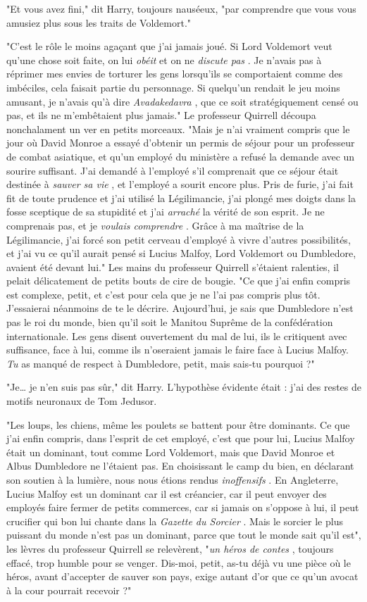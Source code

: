 "Et vous avez fini," dit Harry, toujours nauséeux, "par comprendre que vous vous amusiez plus sous les traits de Voldemort."

"C'est le rôle le moins agaçant que j'ai jamais joué. Si Lord Voldemort veut qu'une chose soit faite, on lui \emph{obéit}  et on ne \emph{discute pas} . Je n'avais pas à réprimer mes envies de torturer les gens lorsqu'ils se comportaient comme des imbéciles, cela faisait partie du personnage. Si quelqu'un rendait le jeu moins amusant, je n'avais qu'à dire \emph{Avadakedavra} , que ce soit stratégiquement censé ou pas, et ils ne m'embêtaient plus jamais." Le professeur Quirrell découpa nonchalament un ver en petits morceaux. "Mais je n'ai vraiment compris que le jour où David Monroe a essayé d'obtenir un permis de séjour pour un professeur de combat asiatique, et qu'un employé du ministère a refusé la demande avec un sourire suffisant. J'ai demandé à l'employé s'il comprenait que ce séjour était destinée à \emph{sauver sa vie} , et l'employé a sourit encore plus. Pris de furie, j'ai fait fit de toute prudence et j'ai utilisé la Légilimancie, j'ai plongé mes doigts dans la fosse sceptique de sa stupidité et j'ai \emph{arraché}  la vérité de son esprit. Je ne comprenais pas, et je \emph{voulais comprendre} . Grâce à ma maîtrise de la Légilimancie, j'ai forcé son petit cerveau d'employé à vivre d'autres possibilités, et j'ai vu ce qu'il aurait pensé si Lucius Malfoy, Lord Voldemort ou Dumbledore, avaient été devant lui." Les mains du professeur Quirrell s'étaient ralenties, il pelait délicatement de petits bouts de cire de bougie. "Ce que j'ai enfin compris est complexe, petit, et c'est pour cela que je ne l'ai pas compris plus tôt. J'essaierai néanmoins de te le décrire. Aujourd'hui, je sais que Dumbledore n'est pas le roi du monde, bien qu'il soit le Manitou Suprême de la confédération internationale. Les gens disent ouvertement du mal de lui, ils le critiquent avec suffisance, face à lui, comme ils n'oseraient jamais le faire face à Lucius Malfoy. \emph{Tu}  as manqué de respect à Dumbledore, petit, mais sais-tu pourquoi ?"

"Je… je n'en suis pas sûr," dit Harry. L'hypothèse évidente était : j'ai des restes de motifs neuronaux de Tom Jedusor.

"Les loups, les chiens, même les poulets se battent pour être dominants. Ce que j'ai enfin compris, dans l'esprit de cet employé, c'est que pour lui, Lucius Malfoy était un dominant, tout comme Lord Voldemort, mais que David Monroe et Albus Dumbledore ne l'étaient pas. En choisissant le camp du bien, en déclarant son soutien à la lumière, nous nous étions rendus \emph{inoffensifs} . En Angleterre, Lucius Malfoy est un dominant car il est créancier, car il peut envoyer des employés faire fermer de petits commerces, car si jamais on s'oppose à lui, il peut crucifier qui bon lui chante dans la \emph{Gazette du Sorcier} . Mais le sorcier le plus puissant du monde n'est pas un dominant, parce que tout le monde sait qu'il est", les lèvres du professeur Quirrell se relevèrent, "\emph{un héros de contes} , toujours effacé, trop humble pour se venger. Dis-moi, petit, as-tu déjà vu une pièce où le héros, avant d'accepter de sauver son pays, exige autant d'or que ce qu'un avocat à la cour pourrait recevoir ?"

